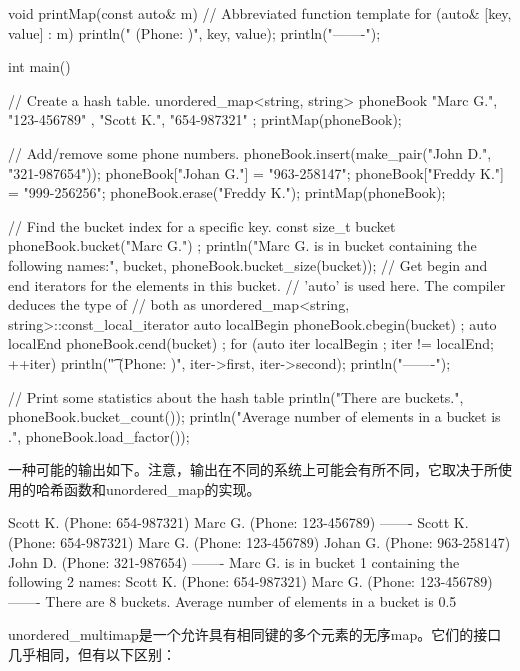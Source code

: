 \begin{cpp}
void printMap(const auto& m) // Abbreviated function template
{
    for (auto& [key, value] : m) {
        println("{} (Phone: {})", key, value);
    }
    println("-------");
}

int main()
{
    // Create a hash table.
    unordered_map<string, string> phoneBook {
        { "Marc G.", "123-456789" },
        { "Scott K.", "654-987321" } };
    printMap(phoneBook);

    // Add/remove some phone numbers.
    phoneBook.insert(make_pair("John D.", "321-987654"));
    phoneBook["Johan G."] = "963-258147";
    phoneBook["Freddy K."] = "999-256256";
    phoneBook.erase("Freddy K.");
    printMap(phoneBook);

    // Find the bucket index for a specific key.
    const size_t bucket { phoneBook.bucket("Marc G.") };
    println("Marc G. is in bucket {} containing the following {} names:",
        bucket, phoneBook.bucket_size(bucket));
    // Get begin and end iterators for the elements in this bucket.
    // 'auto' is used here. The compiler deduces the type of
    // both as unordered_map<string, string>::const_local_iterator
    auto localBegin { phoneBook.cbegin(bucket) };
    auto localEnd { phoneBook.cend(bucket) };
    for (auto iter { localBegin }; iter != localEnd; ++iter) {
        println("\t{} (Phone: {})", iter->first, iter->second);
    }
    println("-------");

    // Print some statistics about the hash table
    println("There are {} buckets.", phoneBook.bucket_count());
    println("Average number of elements in a bucket is {}.",
    phoneBook.load_factor());
}
\end{cpp}

一种可能的输出如下。注意，输出在不同的系统上可能会有所不同，它取决于所使用的哈希函数和unordered\_map的实现。

\begin{shell}
Scott K. (Phone: 654-987321)
Marc G. (Phone: 123-456789)
-------
Scott K. (Phone: 654-987321)
Marc G. (Phone: 123-456789)
Johan G. (Phone: 963-258147)
John D. (Phone: 321-987654)
-------
Marc G. is in bucket 1 containing the following 2 names:
        Scott K. (Phone: 654-987321)
        Marc G. (Phone: 123-456789)
-------
There are 8 buckets.
Average number of elements in a bucket is 0.5
\end{shell}


unordered\_multimap是一个允许具有相同键的多个元素的无序map。它们的接口几乎相同，但有以下区别：

